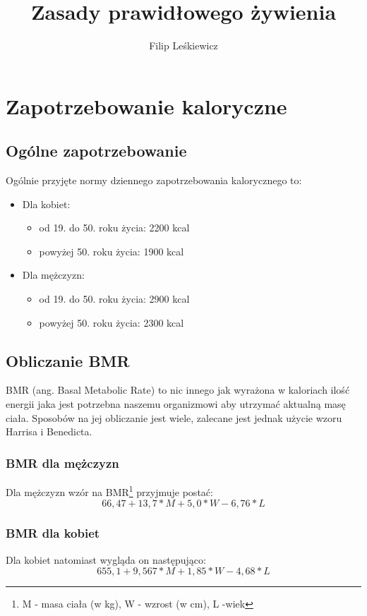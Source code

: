 \documentclass{article}
\date{}
\title{Zasady prawidłowego żywienia}
\author{Filip Leśkiewicz}
\begin{document}
\maketitle
\renewcommand{\contentsname}{Spis treści}
\renewcommand{\refname}{Bibliografia}
\tableofcontents
\newpage
\section{Zapotrzebowanie kaloryczne}
\subsection{Ogólne zapotrzebowanie}
Ogólnie przyjęte normy dziennego zapotrzebowania kalorycznego to:
\begin {itemize}
\item Dla kobiet:
	\begin {itemize}
	\item od 19. do 50. roku życia: 2200 kcal
	\item powyżej 50. roku życia: 1900 kcal
	\end {itemize}
\item Dla mężczyzn:
	\begin {itemize}
	\item od 19. do 50. roku życia: 2900 kcal
	\item powyżej 50. roku życia: 2300 kcal
	\end {itemize}
\end {itemize}
\subsection{Obliczanie BMR}
BMR (ang. Basal Metabolic Rate) to nic innego jak wyrażona w kaloriach ilość energii jaka jest potrzebna naszemu organizmowi aby utrzymać aktualną masę ciała. Sposobów na jej obliczanie jest wiele, zalecane jest jednak użycie wzoru Harrisa i Benedicta. 
\subsubsection{BMR dla mężczyzn}
Dla mężczyzn wzór na BMR\footnote{M - masa ciała (w kg), W - wzrost (w cm), L -wiek} przyjmuje postać:
$$66,47 + 13,7*M + 5,0*W - 6,76*L$$ \label{bmrm}
\subsubsection{BMR dla kobiet}
Dla kobiet natomiast wygląda on następująco:
$$655,1 + 9,567*M + 1,85*W - 4,68*L$$ \label{bmrk}
\newpage
\end{document}
